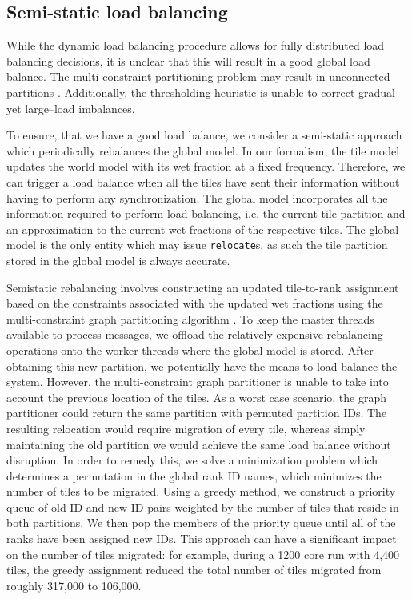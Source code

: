 \subsection{Semi-static load balancing}
While the dynamic load balancing procedure allows for fully distributed load balancing decisions, it is unclear that this will result in a good global load balance. The multi-constraint partitioning problem may result in unconnected partitions \cite{Karypis1998b}.  Additionally, the thresholding heuristic is unable to correct gradual--yet large--load imbalances.

To ensure, that we have a good load balance, we consider a semi-static approach which periodically rebalances the global model.  In our formalism, the tile model updates the world model with its wet fraction at a fixed frequency.  Therefore, we can trigger a load balance when all the tiles have sent their information without having to perform any synchronization. %
The global model incorporates all the information required to perform load balancing, i.e. the current tile partition and an approximation to the current wet fractions of the respective tiles. The global model is the only entity which may issue {\tt relocate}s, as such the tile partition stored in the global model is always accurate.

Semistatic rebalancing involves constructing an updated tile-to-rank assignment based on the constraints associated with the updated wet fractions using the multi-constraint graph partitioning algorithm \cite{Karypis1998b}. To keep the master threads available to process messages, we offload the relatively expensive rebalancing operations onto the worker threads where the global model is stored. After obtaining this new partition, we potentially have the means to load balance the system. However, the multi-constraint graph partitioner is unable to take into account the previous location of the tiles. As a worst case scenario, the graph partitioner could return the same partition with permuted partition IDs. The resulting relocation would require migration of every tile, whereas simply maintaining the old partition we would achieve the same load balance without disruption.
In order to remedy this, we solve a minimization problem which determines a permutation in the global rank ID names, which minimizes the number of tiles to be migrated. Using a greedy method, we construct a priority queue of old ID and new ID pairs weighted by the number of tiles that reside in both partitions. We then pop the members of the priority queue until all of the ranks have been assigned new IDs.
This approach can have a significant impact on the number of tiles migrated: for example, during a 1200 core run with 4,400 tiles, the greedy assignment reduced the total number of tiles migrated from roughly 317,000 to 106,000.